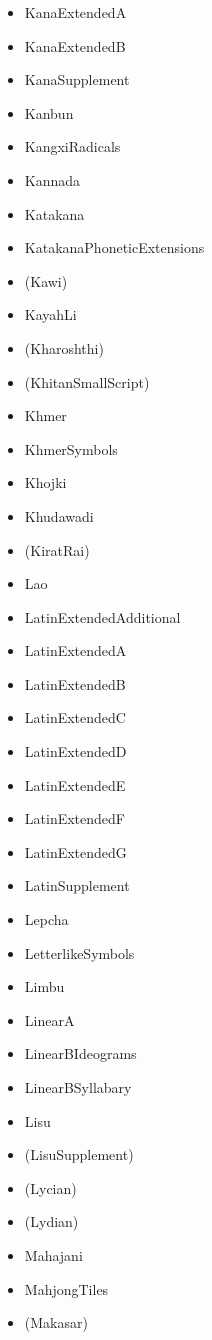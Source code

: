 \documentclass{article}
\newenvironment{itemlist}{%
  \begin{itemize}
  \setlength{\itemsep}{0pt}
  \setlength{\parsep}{0pt}
  \setlength{\topsep}{0pt}
  \setlength{\partopsep}{0pt}
  \setlength{\parskip}{0pt}
  \setlength{\labelsep}{5pt}}%
{
  \end{itemize}}
\begin{document}
\begin{multicols*}{2}
\begin{itemlist}
        \item KanaExtendedA
        \item KanaExtendedB
        \item KanaSupplement
        \item Kanbun
        \item KangxiRadicals
        \item Kannada
        \item Katakana
        \item KatakanaPhoneticExtensions
        \item (Kawi)
        \item KayahLi
        \item (Kharoshthi)
        \item (KhitanSmallScript)
        \item Khmer
        \item KhmerSymbols
        \item Khojki
        \item Khudawadi
        \item (KiratRai)
        \item Lao
        \item LatinExtendedAdditional
        \item LatinExtendedA
        \item LatinExtendedB
        \item LatinExtendedC
        \item LatinExtendedD
        \item LatinExtendedE
        \item LatinExtendedF
        \item LatinExtendedG
        \item LatinSupplement
        \item Lepcha
        \item LetterlikeSymbols
        \item Limbu
        \item LinearA
        \item LinearBIdeograms
        \item LinearBSyllabary
        \item Lisu
        \item (LisuSupplement)
        \item (Lycian)
        \item (Lydian)
        \item Mahajani
        \item MahjongTiles
        \item (Makasar)

\end{itemlist}
\end{multicols*}
\end{document}
